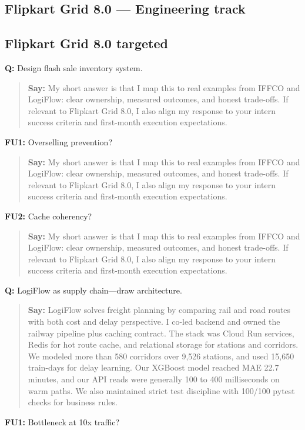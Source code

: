 \documentclass[9pt,a4paper]{article}
\begin{document}
\subsection{Flipkart Grid 8.0 --- Engineering track}
\subsection{Flipkart Grid 8.0 targeted}
\textbf{Q:} Design flash sale inventory system.

\begin{quote}\small\textbf{Say:} My short answer is that I map this to real examples from IFFCO and LogiFlow: clear ownership, measured outcomes, and honest trade-offs. If relevant to Flipkart Grid 8.0, I also align my response to your intern success criteria and first-month execution expectations.\end{quote}
\vspace{2mm}
\textbf{FU1:} Overselling prevention?

\begin{quote}\small\textbf{Say:} My short answer is that I map this to real examples from IFFCO and LogiFlow: clear ownership, measured outcomes, and honest trade-offs. If relevant to Flipkart Grid 8.0, I also align my response to your intern success criteria and first-month execution expectations.\end{quote}
\vspace{2mm}
\textbf{FU2:} Cache coherency?

\begin{quote}\small\textbf{Say:} My short answer is that I map this to real examples from IFFCO and LogiFlow: clear ownership, measured outcomes, and honest trade-offs. If relevant to Flipkart Grid 8.0, I also align my response to your intern success criteria and first-month execution expectations.\end{quote}
\vspace{2mm}
\textbf{Q:} LogiFlow as supply chain---draw architecture.

\begin{quote}\small\textbf{Say:} LogiFlow solves freight planning by comparing rail and road routes with both cost and delay perspective. I co-led backend and owned the railway pipeline plus caching contract. The stack was Cloud Run services, Redis for hot route cache, and relational storage for stations and corridors. We modeled more than 580 corridors over 9,526 stations, and used 15,650 train-days for delay learning. Our XGBoost model reached MAE 22.7 minutes, and our API reads were generally 100 to 400 milliseconds on warm paths. We also maintained strict test discipline with 100/100 pytest checks for business rules.\end{quote}
\vspace{2mm}
\textbf{FU1:} Bottleneck at 10x traffic?
\end{document}
